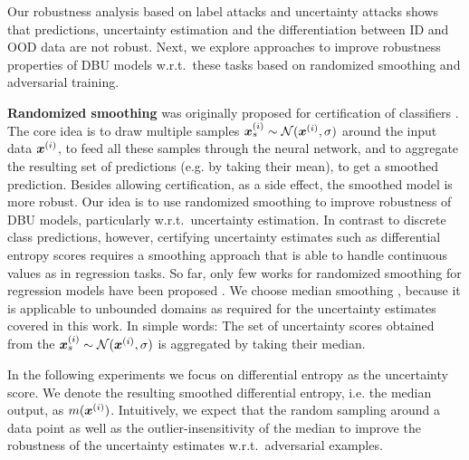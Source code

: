 Our robustness analysis based on label attacks and uncertainty attacks shows that predictions, uncertainty estimation and the differentiation between ID and OOD data are not robust. Next, we explore approaches to improve robustness properties of DBU models w.r.t.\ these tasks based on randomized smoothing and adversarial training. 

\textbf{Randomized smoothing} was originally proposed for certification of classifiers \cite{cohen2019}.
The core idea is to draw multiple samples ${\bm{x}}^{(i)}_s \sim \operatorname{\mathcal{N}}({\bm{x}}^{(i)}, \sigma)$ around the input data ${\bm{x}}^{(i)}$, to feed all these samples through the neural network, and to aggregate the resulting set of predictions (e.g. by taking their mean), to get a smoothed prediction. Besides allowing certification, as a side effect, the smoothed model is more robust. Our idea is to use randomized smoothing to improve robustness of DBU models, particularly w.r.t.\ uncertainty estimation. In contrast to discrete class predictions, however, certifying uncertainty estimates such as differential entropy scores requires a smoothing approach that is able to handle continuous values as in regression tasks. So far, only few works for randomized smoothing for regression models have been proposed \citep{confidence_certificate_rs,median_smoothing}. We choose median smoothing \citep{median_smoothing}, because it is applicable to unbounded domains as required for the uncertainty estimates covered in this work. In simple words: The set of uncertainty scores obtained from the ${\bm{x}}^{(i)}_s \sim \operatorname{\mathcal{N}}({\bm{x}}^{(i)}, \sigma)$ is aggregated by taking their median. 

In the following experiments we focus on differential entropy as the uncertainty score. We denote the resulting smoothed differential entropy, i.e. the median output, as $m({\bm{x}}^{(i)})$.
Intuitively, we expect that the random sampling around a data point as well as the outlier-insensitivity of the median to improve the robustness of the uncertainty estimates w.r.t.\ adversarial examples.

